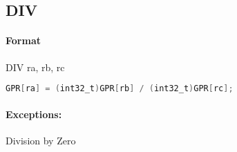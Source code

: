 \subsection{DIV}


\paragraph{Format} DIV ra, rb, rc

\begin{lstlisting}[language=C]
    GPR[ra] = (int32_t)GPR[rb] / (int32_t)GPR[rc];
\end{lstlisting}

\paragraph{Exceptions:} Division by Zero

